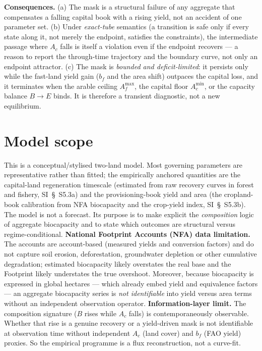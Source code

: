 \documentclass[11pt]{article}
\begin{document}
\noindent\textbf{Consequences.} (a) The mask is a structural failure of any aggregate that compensates a falling capital book with a rising yield, not an accident of one parameter set. (b) Under \emph{exact-tube} semantics (a transition is safe only if every state along it, not merely the endpoint, satisfies the constraints), the intermediate passage where $A_c$ falls is itself a violation even if the endpoint recovers --- a reason to report the through-time trajectory and the boundary curve, not only an endpoint attractor. (c) The mask is \emph{bounded and deficit-limited}: it persists only while the fast-land yield gain ($b_f$ and the area shift) outpaces the capital loss, and it terminates when the arable ceiling $A_f^{\max}$, the capital floor $A_c^{\min}$, or the capacity balance $B\to E$ binds. It is therefore a transient diagnostic, not a new equilibrium.

\section{Model scope}

This is a conceptual/stylised two-land model. Most governing parameters are representative rather than fitted; the empirically anchored quantities are the capital-land regeneration timescale (estimated from raw recovery curves in forest and fishery, SI~\S\ S5.3a) and the provisioning-book yield and area (the cropland-book calibration from NFA biocapacity and the crop-yield index, SI~\S\ S5.3b). The model is not a forecast. Its purpose is to make explicit the \emph{composition} logic of aggregate biocapacity and to state which outcomes are structural versus regime-conditional. \textbf{National Footprint Accounts (NFA) data limitation.} The accounts are account-based (measured yields and conversion factors) and do not capture soil erosion, deforestation, groundwater depletion or other cumulative degradation; estimated biocapacity likely overstates the real base and the Footprint likely understates the true overshoot. Moreover, because biocapacity is expressed in global hectares --- which already embed yield and equivalence factors --- an aggregate biocapacity series is \emph{not identifiable} into yield versus area terms without an independent observation operator. \textbf{Information-layer limit.} The composition signature ($B$ rises while $A_c$ falls) is contemporaneously observable. Whether that rise is a genuine recovery or a yield-driven mask is not identifiable at observation time without independent $A_c$ (land cover) and $b_f$ (FAO yield) proxies. So the empirical programme is a flux reconstruction, not a curve-fit.
\end{document}
